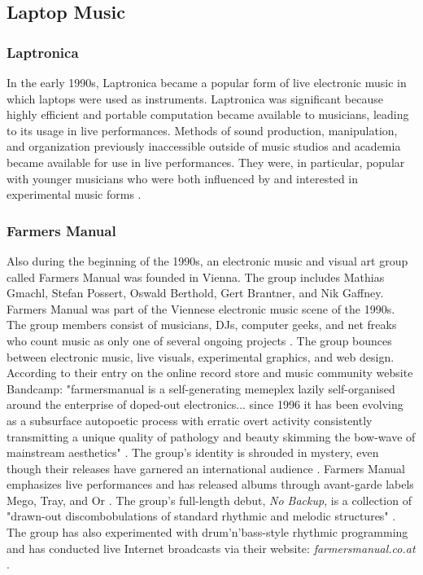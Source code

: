 \documentclass[letterpaper, 12pt]{article}
\begin{document}
\subsection{Laptop Music}

\subsubsection{Laptronica}


%
In the early 1990s, Laptronica became a popular form of live electronic music in which laptops were used as instruments.
%
Laptronica was significant because highly efficient and portable computation became available to musicians, leading to its usage in live performances.
%
Methods of sound production, manipulation, and organization previously inaccessible outside of music studios and academia became available for use in live performances. They were, in particular, popular with younger musicians who were both influenced by and interested in experimental music forms \citep{emmerson2017living}.
%

\subsubsection{Farmers Manual}


Also during the beginning of the 1990s, an electronic music and visual art group called Farmers Manual was founded in Vienna.
%
The group includes Mathias Gmachl, Stefan Possert, Oswald Berthold, Gert Brantner, and Nik Gaffney.
%
Farmers Manual was part of the Viennese electronic music scene of the 1990s.
%
The group members consist of musicians, DJs, computer geeks, and net freaks who count music as only one of several ongoing projects \citep{cooper2024farmers} \citep{allmusic2024farmers}.
%
The group bounces between electronic music, live visuals, experimental graphics, and web design.
%
According to their entry on the online record store and music community website Bandcamp: "farmersmanual is a self-generating memeplex lazily self-organised around the enterprise of doped-out electronics... since 1996 it has been evolving as a subsurface autopoetic process with erratic overt activity consistently transmitting a unique quality of pathology and beauty skimming the bow-wave of mainstream aesthetics" \citep{bandcamp2024farmers}.
%
The group's identity is shrouded in mystery, even though their releases have garnered an international audience \citep{cooper2024farmers} \citep{allmusic2024farmers}.
%
Farmers Manual emphasizes live performances and has released albums through avant-garde labels Mego, Tray, and Or \citep{last2014farmers}.
%
The group's full-length debut, \textit{No Backup}, is a collection of "drawn-out discombobulations of standard rhythmic and melodic structures" \citep{cooper2024farmers} \citep{allmusic2024farmers}.
%
The group has also experimented with drum'n'bass-style rhythmic programming and has conducted live Internet broadcasts via their website: \textit{farmersmanual.co.at} \citep{cooper2024farmers} \citep{allmusic2024farmers}.
\end{document}
